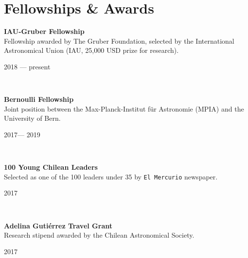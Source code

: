 \documentclass[12pt, a4paper]{article} %
\begin{document}
\section*{Fellowships \& Awards}

\begin{minipage}[t]{0.7\textwidth}
\begin{flushleft}%
  \setlength{\leftskip}{0.2cm}%
\textbf{IAU-Gruber Fellowship}\\
Fellowship awarded by The Gruber Foundation, selected by the International Astronomical Union (IAU, 25,000 USD prize for research).
\end{flushleft}
\end{minipage}
\begin{minipage}[t]{0.3\textwidth}
\hfill 2018 --- present
\end{minipage}\\

\begin{minipage}[t]{0.7\textwidth}
\begin{flushleft}%
  \setlength{\leftskip}{0.2cm}%
\textbf{Bernoulli Fellowship}\\
Joint position between the Max-Planck-Institut f\"ur Astronomie (MPIA) and the University of Bern.
\end{flushleft}
\end{minipage}
\begin{minipage}[t]{0.3\textwidth}
\hfill 2017--- 2019
\end{minipage}\\

\begin{minipage}[t]{0.7\textwidth}
\begin{flushleft}%
  \setlength{\leftskip}{0.2cm}%
\textbf{100 Young Chilean Leaders}\\
Selected as one of the 100 leaders under 35 by \texttt{El Mercurio} newspaper.
\end{flushleft}
\end{minipage}
\begin{minipage}[t]{0.3\textwidth}
\hfill 2017
\end{minipage}\\

\begin{minipage}[t]{0.7\textwidth}
\begin{flushleft}%
  \setlength{\leftskip}{0.2cm}%
\textbf{Adelina Guti\'errez Travel Grant}\\
Research stipend awarded by the Chilean Astronomical Society.
\end{flushleft}
\end{minipage}
\begin{minipage}[t]{0.3\textwidth}
\hfill 2017
\end{minipage}\\
\end{document}
